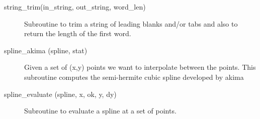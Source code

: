 \begin{description}
\item[string\_trim(in\_string, out\_string, word\_len)] \Newline 
Subroutine to trim a string of leading blanks and/or tabs and also to return the
length of the first word.

\item[spline\_akima (spline, stat)] \Newline 
Given a set of (x,y) points we want to interpolate between the points.
This subroutine computes the semi-hermite cubic spline developed by akima

\item[spline\_evaluate (spline, x, ok, y, dy)] \Newline 
Subroutine to evaluate a spline at a set of points.

\end{description}
